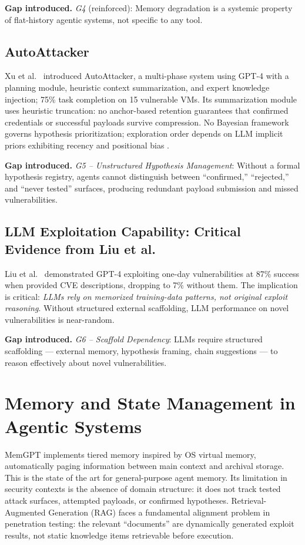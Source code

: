 \documentclass[12pt,a4paper,oneside,openany]{book}
\begin{document}
\textbf{Gap introduced.} \textit{G4} (reinforced): Memory degradation is a systemic property of flat-history agentic systems, not specific to any tool.

\subsection{AutoAttacker}

Xu et al.\ \cite{xu2024autoattacker} introduced AutoAttacker, a multi-phase system using GPT-4 with a planning module, heuristic context summarization, and expert knowledge injection; 75\% task completion on 15 vulnerable VMs. Its summarization module uses heuristic truncation: no anchor-based retention guarantees that confirmed credentials or successful payloads survive compression. No Bayesian framework governs hypothesis prioritization; exploration order depends on LLM implicit priors exhibiting recency and positional bias \cite{ji2023survey}.

\textbf{Gap introduced.} \textit{G5 -- Unstructured Hypothesis Management}: Without a formal hypothesis registry, agents cannot distinguish between ``confirmed,'' ``rejected,'' and ``never tested'' surfaces, producing redundant payload submission and missed vulnerabilities.

\subsection{LLM Exploitation Capability: Critical Evidence from Liu et al.}

Liu et al.\ \cite{liu2024gpts} demonstrated GPT-4 exploiting one-day vulnerabilities at 87\% success when provided CVE descriptions, dropping to 7\% without them. The implication is critical: \textit{LLMs rely on memorized training-data patterns, not original exploit reasoning}. Without structured external scaffolding, LLM performance on novel vulnerabilities is near-random.

\textbf{Gap introduced.} \textit{G6 -- Scaffold Dependency}: LLMs require structured scaffolding --- external memory, hypothesis framing, chain suggestions --- to reason effectively about novel vulnerabilities.

\section{Memory and State Management in Agentic Systems}

MemGPT \cite{packer2023memgpt} implements tiered memory inspired by OS virtual memory, automatically paging information between main context and archival storage. This is the state of the art for general-purpose agent memory. Its limitation in security contexts is the absence of domain structure: it does not track tested attack surfaces, attempted payloads, or confirmed hypotheses. Retrieval-Augmented Generation (RAG) \cite{lewis2020rag} faces a fundamental alignment problem in penetration testing: the relevant ``documents'' are dynamically generated exploit results, not static knowledge items retrievable before execution.
\end{document}
